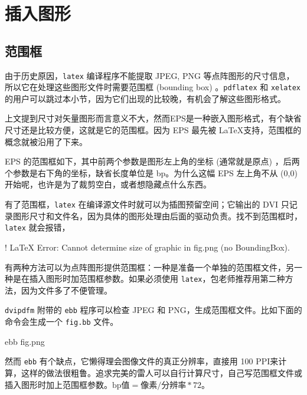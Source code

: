 \section{插入图形}
\label{sec:includegraphics}

\subsection{范围框}

由于历史原因，\texttt{latex} 编译程序不能提取 JPEG, PNG 等点阵图形的尺寸信息，所以它在处理这些图形文件时需要范围框 (bounding box) 。\texttt{pdflatex} 和 \texttt{xelatex} 的用户可以跳过本小节，因为它们出现的比较晚，有机会了解这些图形格式。

上文提到尺寸对矢量图形而言意义不大，然而EPS是一种嵌入图形格式，有个缺省尺寸还是比较方便，这就是它的范围框。因为 EPS 最先被 \LaTeX 支持，范围框的概念就被沿用了下来。

EPS 的范围框如下，其中前两个参数是图形左上角的坐标 (通常就是原点) ，后两个参数是右下角的坐标，缺省长度单位是 bp。为什么这幅 EPS 左上角不从 (0,0) 开始呢，也许是为了裁剪空白，或者想隐藏点什么东西。

\begin{Code}[]
\end{Code}

有了范围框，\texttt{latex} 在编译源文件时就可以为插图预留空间；它输出的 DVI 只记录图形尺寸和文件名，因为具体的图形处理由后面的驱动负责。找不到范围框时，\texttt{latex} 就会报错，

\begin{Code}[]
! LaTeX Error: Cannot determine size of graphic in fig.png (no BoundingBox).
\end{Code}

有两种方法可以为点阵图形提供范围框：一种是准备一个单独的范围框文件，另一种是在插入图形时加范围框参数。如果必须使用 \texttt{latex}，包老师推荐用第二种方法，因为文件多了不便管理。

\texttt{dvipdfm} 附带的 \texttt{ebb} 程序可以检查 JPEG 和 PNG，生成范围框文件。比如下面的命令会生成一个 \texttt{fig.bb} 文件。

\begin{Code}[]
ebb fig.png
\end{Code}

然而 \texttt{ebb} 有个缺点，它懒得理会图像文件的真正分辨率，直接用 100 PPI来计算，这样的做法很粗鲁。追求完美的雷人可以自行计算尺寸，自己写范围框文件或插入图形时加上范围框参数。$ \text{bp值} = \text{像素} / \text{分辨率} * 72 $。

